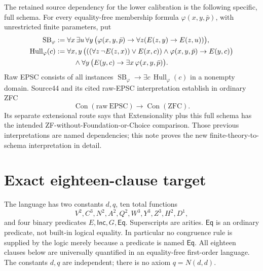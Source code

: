 \documentclass[11pt]{article}
\newcommand{\Eq}{\mathsf{Eq}}
\newcommand{\Inc}{\mathsf{Inc}}
\newcommand{\Con}{\operatorname{Con}}
\begin{document}
The retained source dependency for the lower calibration is the following
specific, full schema. For every equality-free membership formula
$\varphi(x,y,\bar p)$, with unrestricted finite parameters, put
\begin{align*}
\operatorname{SB}_\varphi
 &:=\forall x\,\exists u\,\forall y\,
  \bigl(\varphi(x,y,\bar p)\to
         \forall z(E(z,y)\to E(z,u))\bigr),\\
\operatorname{Hull}_\varphi(c)
 &:=\forall x,y\,
  \bigl(((\forall z\,\neg E(z,x))\lor E(x,c))\land
          \varphi(x,y,\bar p)\to E(y,c)\bigr)\\
 &\hspace{9mm}\land\forall y\,
       \bigl(E(y,c)\to\exists x\,\varphi(x,y,\bar p)\bigr).
\end{align*}
Raw EPSC consists of all instances
$\operatorname{SB}_\varphi\to\exists c\,
\operatorname{Hull}_\varphi(c)$ in a nonempty domain.
Source44 and its cited raw-EPSC interpretation establish in ordinary ZFC
\[
\Con(\mathrm{raw\ EPSC})\longrightarrow\Con(\mathrm{ZFC}).
\]
Its separate extensional route says that Extensionality plus this full
schema has the intended ZF-without-Foundation-or-Choice comparison. Those
previous interpretations are named dependencies; this note proves the
new finite-theory-to-schema interpretation in detail.

\section{Exact eighteen-clause target}

The language has two constants $d,q$, ten total functions
\[
 V^2,C^3,N^2,A^2,Q^2,W^3,Y^3,Z^3,H^2,D^1,
\]
and four binary predicates $E,\Inc,G,\Eq$. Superscripts are arities.
$\Eq$ is an ordinary predicate, not built-in logical equality. In
particular no congruence rule is supplied by the logic merely because a
predicate is named $\Eq$. All eighteen clauses below are universally
quantified in an equality-free first-order language. The constants $d,q$
are independent; there is no axiom $q=N(d,d)$.
\end{document}
